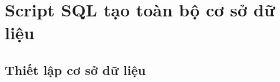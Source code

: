 \documentclass[11pt]{report}
\begin{document}

\nocite{*}


\appendix

\chapter{Script SQL tạo toàn bộ cơ sở dữ liệu}

\section{Thiết lập cơ sở dữ liệu}
\end{document}
